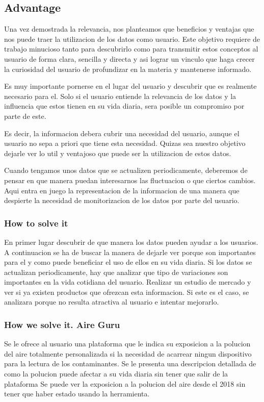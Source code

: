 \subsection{Advantage}
Una vez demostrada la relevancia, nos planteamos que beneficios y ventajas que nos puede traer la utilizacion de los datos como usuario. 
Este objetivo requiere de trabajo minucioso tanto para descubrirlo como para transmitir estos conceptos al usuario de forma clara, 
sencilla y directa y asi lograr un vinculo que haga crecer la curiosidad del usuario de profundizar en la materia y
mantenerse informado.

Es muy importante pornerse en el lugar del usuario y descubrir que es realmente necesario para el. Solo si el usuario entiende la relevancia de 
los datos y la influencia que estos tienen en su vida diaria, sera posible un compromiso por parte de este.

Es decir, la informacion debera cubrir una necesidad del usuario, aunque el usuario no sepa a priori que tiene esta necesidad. Quizas sea 
nuestro objetivo dejarle ver lo util y ventajoso que puede ser la utilizacion de estos datos.

Cuando tengamos unos datos que se actualizen periodicamente, deberemos de pensar en que manera puedan interesarnos las fluctuacion o que ciertos
cambios. Aqui entra en juego la representacion de la informacion de una manera que despierte la necesidad de monitorizacion de los datos por parte
del usuario.

\subsubsection{How to solve it} 
En primer lugar descubrir de que manera los datos pueden ayudar a los usuarios. A continuacion se ha de buscar la manera de dejarle ver
porque son importantes para el y como puede beneficiar el uso de ellos en su vida diaria.
Si los datos se actualizan periodicamente, hay que analizar que tipo de variaciones son importantes en la vida cotidiana del usuario.
Realizar un estudio de mercado y ver si ya existen productos que ofrezcan esta informacion. Si este es el caso, se analizara porque no
resulta atractiva al usuario e intentar mejorarlo.

\subsubsection{How we solve it. Aire Guru} 
Se le ofrece al usuario una plataforma que le indica su exposicion a la polucion del aire totalmente personalizada si la necesidad de acarrear
ningun dispositivo para la lectura de los contaminantes.
Se le presenta una descripcion detallada de como la polucion puede afectar a su vida diaria sin tener que salir de la plataforma
Se puede ver la exposicion a la polucion del aire desde el 2018 sin tener que haber estado usando la herramienta.
 
